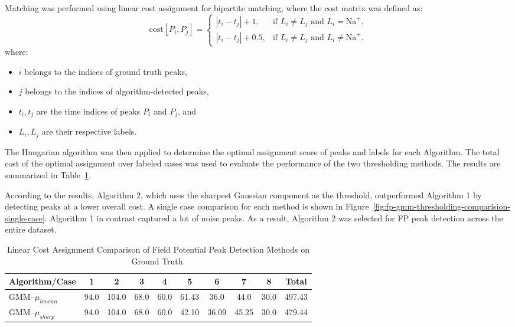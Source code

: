 \documentclass{report}
\begin{document}
            Matching was performed using linear cost assignment for bipartite matching, where the cost matrix was defined as:
            \[
            \text{cost}[P_i, P_j] =
            \begin{cases} 
                |t_i - t_j| + 1, & \text{if } L_i \neq L_j \text{ and } L_i = \text{Na}^+,\\
                |t_i - t_j| + 0.5, & \text{if } L_i \neq L_j \text{ and } L_i \neq \text{Na}^+.
            \end{cases}
            \]
            where:
            \begin{itemize}
                \item \(i\) belongs to the indices of ground truth peaks,
                \item \(j\) belongs to the indices of algorithm-detected peaks,
                \item \(t_i, t_j\) are the time indices of peaks \(P_i\) and \(P_j\), and
                \item \(L_i, L_j\) are their respective labels.
            \end{itemize}
            
            The Hungarian algorithm \cite{HungarianAlgorithmWiki} was then applied to determine the optimal assignment score of peaks and labels for each Algorithm. The total cost of the optimal assignment over labeled cases was used to evaluate the performance of the two thresholding methods. The results are summarized in Table~\ref{tab:selected_peak_cases}.
            
            According to the results, Algorithm 2, which uses the sharpest Gaussian component as the threshold, outperformed Algorithm 1 by detecting peaks at a lower overall cost. A single case comparison for each method is shown in Figure~\ref{fig:fp-gmm-thresholding-comparision-single-case}. Algorithm 1 in contrast captured a lot of noise peaks. As a result, Algorithm 2 was selected for FP peak detection across the entire dataset.



            \begin{table}[H]
                \centering
                \caption{Linear Cost Assignment Comparison of Field Potential Peak Detection Methods on Ground Truth.}
                \label{tab:selected_peak_cases}
                \renewcommand{\arraystretch}{1.2} %
                \begin{tabular}{p{3cm} *{8}{c} c}
                    \toprule
                    \textbf{Algorithm/Case} & \textbf{1} & \textbf{2} & \textbf{3} & \textbf{4} & \textbf{5} & \textbf{6} & \textbf{7} & \textbf{8} & \textbf{Total} \\
                    \midrule
                    GMM--$\mu_{hmean}$ & 94.0 & 104.0 & 68.0 & 60.0 & 61.43 & 36.0 & 44.0 & 30.0 & 497.43 \\
                    GMM--$\mu_{sharp}$ & 94.0 & 104.0 & 68.0 & 60.0 & 42.10 & 36.09 & 45.25 & 30.0 & 479.44 \\
                    \bottomrule
                \end{tabular}
            \end{table}
            
\end{document}
